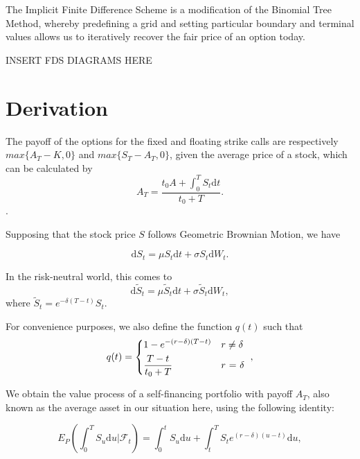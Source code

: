 \documentclass{article}
\begin{document}
The Implicit Finite Difference Scheme is a modification of the Binomial Tree Method, whereby predefining a grid and setting particular boundary and terminal values allows us to iteratively recover the fair price of an option today.

INSERT FDS DIAGRAMS HERE

\section{Derivation}

The payoff of the options for the fixed and floating strike calls are respectively \(max\{A_T - K, 0\}\) and \(max\{S_T - A_T, 0\}\), given the average price of a stock, which can be calculated by
\begin{equation}
  A_T = \frac{t_0A + \int_0^T S_t \mathrm{d}t}{t_0 + T}.
\end{equation}.

Supposing that the stock price \(S\) follows Geometric Brownian Motion, we have

\begin{equation}
  \mathrm{d}S_t = \mu S_t \mathrm{d}t + \sigma S_t \mathrm{d}W_t.
\end{equation}

In the risk-neutral world, this comes to
\begin{equation}
  \mathrm{d}\tilde{S}_t = \mu \tilde{S}_t \mathrm{d}t + \sigma \tilde{S}_t \mathrm{d}W_t,
\end{equation}
where \(\tilde{S}_t = e^{-\delta(T-t)}S_t\).

For convenience purposes, we also define the function \(q(t)\) such that
\begin{equation}
  q(t) =
  \begin{dcases*}
    1 - e^{-(r-\delta)(T-t)} & \(r \neq \delta\) \\
    \frac{T-t}{t_0 + T} & \(r\) = \(\delta\)
  \end{dcases*},
\end{equation}

We obtain the value process of a self-financing portfolio with payoff \(A_T\), also known as the average asset in our situation here, using the following identity:

\begin{equation}
  E_P(\int_0^TS_u\textrm{d}u | \mathcal{F}_t) = \int_0^t S_u \textrm{d}u + \int_t^T S_te^{(r-\delta)(u-t)}\textrm{d}u,
\end{equation}
\end{document}

